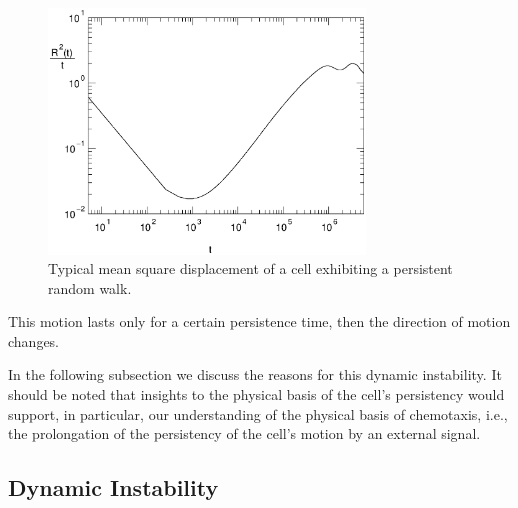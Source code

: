 \documentclass[aps,preprint,pre,array,epsfig,eqsecnum]{revtex4}
\begin{document}
%
\begin{figure}[h] %
  \begin{center}
    \includegraphics[width=0.75\textwidth, angle=0]
{Nandy3.eps}    
    \caption{Typical mean square displacement of a cell 
    exhibiting a persistent random walk.} 
    \label{fig:msd_d2}
  \end{center}
\end{figure}
%
This motion lasts only for a certain persistence time, then
the direction of motion changes. 

In the following subsection we discuss 
the reasons for this dynamic instability.
It should be noted that insights to the physical basis of the cell's
persistency 
would support, in particular, our
understanding of the physical basis of chemotaxis, i.e., the prolongation
of the persistency of the cell's motion by an external signal. 









\subsection{Dynamic Instability}
\end{document}
